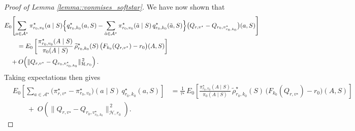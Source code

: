\documentclass[11pt]{article}
\theoremstyle{plain}
\begin{document}
\begin{proof}[Proof of Lemma \ref{lemma::vonmises_softstar}]
We have now shown that
\begin{align*}
&E_0\!\left[\sum_{a \in \mathcal{A}^\star} \pi_{r_0,v_0}^\star(a \mid S)
   \Bigl\{ q_{r_0,k_0}^\star(a,S) - \sum_{\tilde a \in \mathcal{A}^\star} 
          \pi_{r_0,v_0}^\star(\tilde a \mid S)\, q_{r_0,k_0}^\star(\tilde a,S) \Bigr\}
   \bigl(Q_{r,v^\star} - Q_{r_0,v_{r_0,k_0}^\star}\bigr)(a,S)\right] \\
&\qquad= E_0 \left[
        \frac{\pi_{r_0,v_0}^\star(A \mid S)}{\pi_0(A \mid S)}\,
        \widetilde{\rho}_{r_0,k_0}^\star(S)\,
        \bigl(F_{k_0}(Q_{r,v^\star})-r_0\bigr)(A,S)
      \right] \\
&\quad +
O\!\left(\|Q_{r,v^\star} - Q_{r_0,v_{r_0,k_0}^\star}\|_{\mathcal{H},r_0}^{\,2}\right).
\end{align*}
Taking expectations then gives
\begin{align*}
&E_0\!\left[\sum_{a \in \mathcal{A}^\star}
\bigl(\pi_{r,v^\star}^\star - \pi_{r_0,v_0}^\star\bigr)(a \mid S)\,
q_{r_0,k_0}^\star(a,S)\right]
&= \frac{1}{\tau^\star}\,
	    E_0 \left[ 
	        \frac{\pi_{r_0,v_0}^\star(A \mid S)}{\pi_0(A \mid S)}\,
	        \widetilde{\rho}_{r_0,k_0}^\star(S)\,
	        \bigl(F_{k_0}(Q_{r,v^\star})-r_0\bigr)(A,S) \right] \\
	&\qquad +\;
	O\!\left(\|Q_{r,v^\star} - Q_{r_0,v_{r_0,k_0}^\star}\|_{\mathcal{H},r_0}^{\,2}\right).
\end{align*}


\end{proof}
\end{document}
